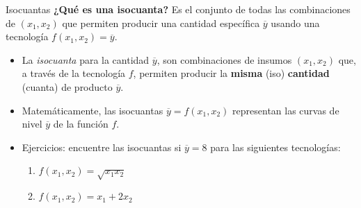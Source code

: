 \documentclass{beamer}
\theoremstyle{definition}
\begin{document}
\begin{frame}{Isocuantas}
\textbf{¿Qué es una isocuanta?}
Es el conjunto de todas las combinaciones de $(x_1,x_2)$ que permiten producir una cantidad específica $\overline{y}$ usando una tecnología $f(x_1,x_2)=\overline{y}$.
	\begin{itemize}
		\item La \textit{isocuanta} para la cantidad $\overline{y}$, son combinaciones de insumos $(x_1,x_2)$ que, a través de la tecnología $f$, permiten producir la \textbf{misma }(iso) \textbf{cantidad} (cuanta) de producto $\overline{y}$.
		\item Matemáticamente,  las isocuantas $\overline{y}=f(x_1,x_2)$ representan las curvas de nivel $\overline{y}$ de la función $f$.
		\item Ejercicios: encuentre las isocuantas si $\overline{y}=8$ para las siguientes tecnologías:
		\begin{enumerate}
		    \item $f(x_1,x_2)=\sqrt{x_1x_2}$
		    \item $f(x_1,x_2)=x_1+2x_2$
		\end{enumerate}
	\end{itemize}
\end{frame}
\end{document}
